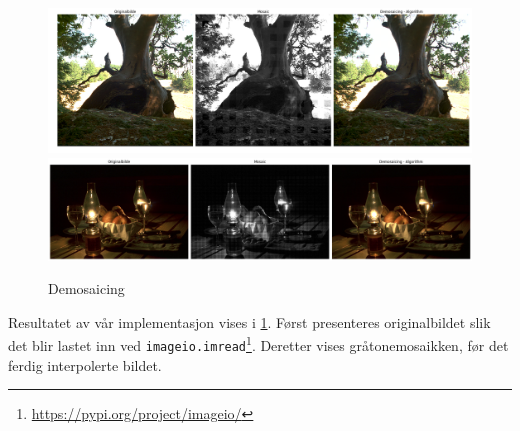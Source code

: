 \begin{figure}
\begin{center}
    \includegraphics[width=1\columnwidth]{bilder/tree_mosaic.png} \label{Figur 3}
    \includegraphics[width=1\columnwidth]{bilder/stillLife_mosaic.png}
    \caption{Demosaicing \label{Figur 4}}
\end{center}
\end{figure}
Resultatet av vår implementasjon vises i \ref{Figur 4}. Først presenteres originalbildet slik det blir lastet inn ved \texttt{imageio.imread}\footnote{\url{https://pypi.org/project/imageio/}}. Deretter vises gråtonemosaikken, før det ferdig interpolerte bildet. 